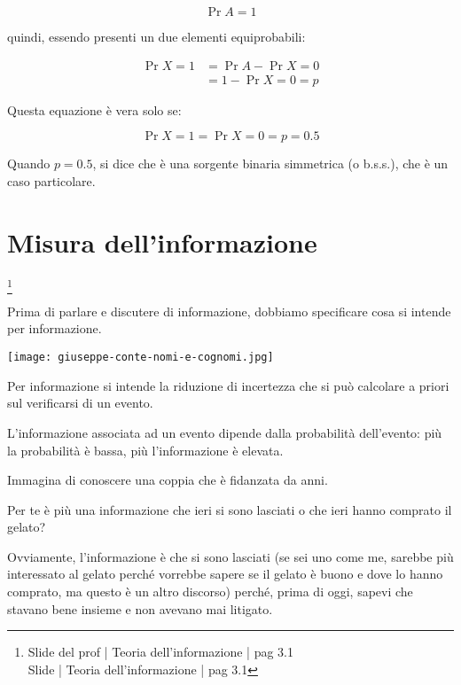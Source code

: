 {
    \Large 
    \begin{equation}
        \Pr{A} = 1
    \end{equation}
}

quindi, essendo presenti un due elementi equiprobabili: 

{
    \Large 
    \begin{equation}
        \begin{split}
            \Pr{X = 1} &= \Pr{A} - \Pr{X = 0}
            \\
            &= 1 - \Pr{ X = 0} = p
        \end{split}
    \end{equation}
}

Questa equazione è vera solo se: 

{
    \Large 
    \begin{equation}
        \Pr{X = 1} = \Pr{X = 0}  = p = 0.5
    \end{equation}
}

Quando $p= 0.5$, si dice che è una sorgente binaria simmetrica (o b.s.s.), che è un caso particolare. \newline 

\newpage 

\section{Misura dell'informazione}
\footnote{Slide del prof | Teoria dell'informazione | pag 3.1 \\  
Slide | Teoria dell'informazione | pag 3.1 
}

Prima di parlare e discutere di informazione, dobbiamo specificare cosa si intende per informazione. \newline 

\begin{tcolorbox}
    \texttt{[image: giuseppe-conte-nomi-e-cognomi.jpg]}
\end{tcolorbox}

Per informazione si intende la riduzione di incertezza che si può calcolare a priori sul verificarsi di un evento. \newline 

L'informazione associata ad un evento dipende dalla probabilità dell'evento: più la probabilità è bassa, più l'informazione è elevata. \newline 

\begin{tcolorbox}
    Immagina di conoscere una coppia che è fidanzata da anni. \newline
    
    Per te è più una informazione che ieri si sono lasciati o che ieri hanno comprato il gelato? \newline 

    Ovviamente, l'informazione è che si sono lasciati (se sei uno come me, sarebbe più interessato al gelato perché vorrebbe sapere se il gelato è buono e dove lo hanno comprato, ma questo è un altro discorso) 
    perché, prima di oggi, sapevi che stavano bene insieme e non avevano mai litigato. 

\end{tcolorbox}


